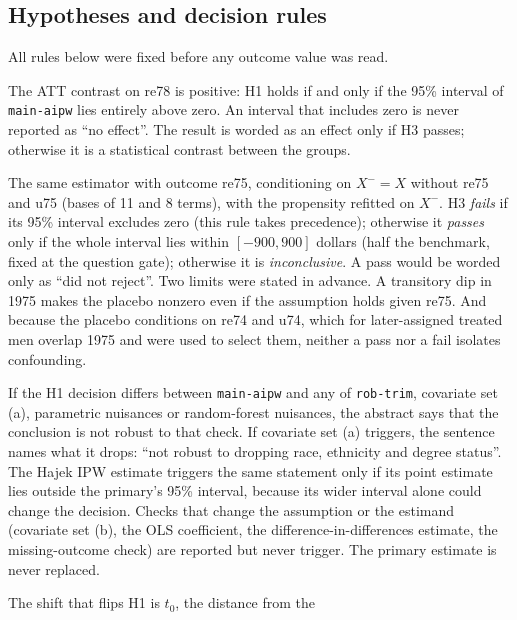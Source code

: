 \documentclass[11pt]{article}
\newcommand{\run}[1]{\texttt{#1}}
\begin{document}
\subsection{Hypotheses and decision rules}
\label{sec:rules}

All rules below were fixed before any outcome value was read.
\begin{description}
  \setlength{\itemsep}{2pt}
  \item[H1.] The ATT contrast on re78 is positive: H1 holds if and only if the 95\% interval
        of \run{main-aipw} lies entirely above zero. An interval that includes zero is never
        reported as ``no effect''. The result is worded as an effect only if H3 passes;
        otherwise it is a statistical contrast between the groups.
  \item[H3 (placebo).] The same estimator with outcome re75, conditioning on
        $X^{-} = X$ without re75 and u75 (bases of 11 and 8 terms), with the propensity
        refitted on $X^{-}$. H3 \emph{fails} if its 95\% interval excludes zero (this rule
        takes precedence); otherwise it \emph{passes} only if the whole interval lies within
        $[-900, 900]$ dollars (half the benchmark, fixed at the question gate); otherwise it
        is \emph{inconclusive}. A pass would be worded only as ``did not reject''. Two
        limits were stated in advance. A transitory dip in 1975 makes the placebo nonzero
        even if the assumption holds given re75. And because the placebo conditions on re74
        and u74, which for later-assigned treated men overlap 1975 and were used to select
        them, neither a pass nor a fail isolates confounding.
  \item[Disagreement rule.] If the H1 decision differs between \run{main-aipw} and any of
        \run{rob-trim}, covariate set (a), parametric nuisances or random-forest nuisances,
        the abstract says that the conclusion is not robust to that check. If covariate set
        (a) triggers, the sentence names what it drops: ``not robust to dropping race,
        ethnicity and degree status''. The Hajek IPW estimate triggers the same statement only
        if its point estimate lies outside the primary's 95\% interval, because its wider
        interval alone could change the decision. Checks that change the assumption or the
        estimand (covariate set (b), the OLS coefficient, the difference-in-differences
        estimate, the missing-outcome check) are reported but never trigger. The primary
        estimate is never replaced.
  \item[Sensitivity reading.] The shift that flips H1 is $t_0$, the distance from the

\end{description}
\end{document}
